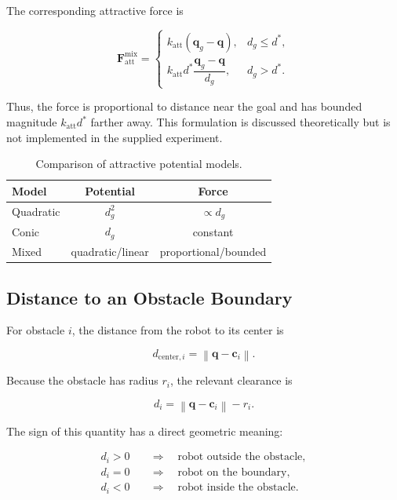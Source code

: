 \documentclass[10pt,twocolumn,a4paper]{article}
\begin{document}
The corresponding attractive force is

\begin{equation}
\mathbf{F}_{\mathrm{att}}^{\mathrm{mix}}
=
\begin{cases}

k_{\mathrm{att}}(\mathbf{q}_g-\mathbf{q}),
& d_g\leq d^*, \\

k_{\mathrm{att}}d^*
\dfrac{\mathbf{q}_g-\mathbf{q}}{d_g},
& d_g>d^*.
\end{cases}
\label{eq:mixed_force}
\end{equation}

Thus, the force is proportional to distance near the goal and has bounded
magnitude $k_{\mathrm{att}}d^*$ farther away. This formulation is discussed
theoretically but is not implemented in the supplied experiment.

\begin{table}[htbp]
\centering
\caption{Comparison of attractive potential models.}
\label{tab:attractive_models}
\small
\begin{tabular}{lcc}
\toprule
\textbf{Model} & \textbf{Potential} & \textbf{Force} \\
\midrule
Quadratic & $d_g^2$ & $\propto d_g$ \\
Conic & $d_g$ & constant \\
Mixed & quadratic/linear & proportional/bounded \\
\bottomrule
\end{tabular}
\end{table}

\subsection{Distance to an Obstacle Boundary}

For obstacle $i$, the distance from the robot to its center is

\[
    d_{\mathrm{center},i}
    =
    \left\|\mathbf{q}-\mathbf{c}_i\right\|.
\]

Because the obstacle has radius $r_i$, the relevant clearance is

\begin{equation}
    d_i
    =
    \left\|\mathbf{q}-\mathbf{c}_i\right\|-r_i.
    \label{eq:clearance}
\end{equation}

The sign of this quantity has a direct geometric meaning:

\[
\begin{aligned}
    d_i>0 &\quad\Rightarrow\quad \text{robot outside the obstacle},\\
    d_i=0 &\quad\Rightarrow\quad \text{robot on the boundary},\\
    d_i<0 &\quad\Rightarrow\quad \text{robot inside the obstacle}.
\end{aligned}
\]
\end{document}
